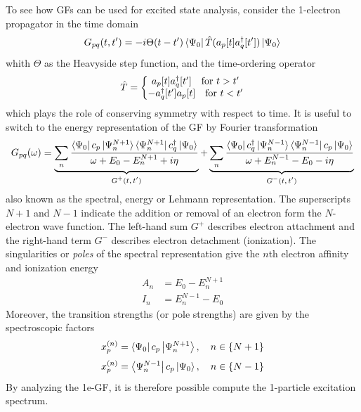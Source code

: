 To see how GFs can be used for excited state analysis, consider the 1-electron propagator in the time domain
\begin{equation}
G_{pq}(t,t') = - i\Theta(t-t') \bra{\smash{\Psi_0}} \hat{T}(a_p[t]a
_q^{\dagger}[t']) \ket{\smash{\Psi_0}}
\end{equation}
\noindent whith $\Theta$ as the Heavyside step function, and the time-ordering operator 
\begin{equation}
\hat{T} = \left\lbrace \begin{matrix}
a_p[t] a_q^{\dagger}[t'] \quad \textrm{for } t > t' \\
-a_q^{\dagger}[t'] a_p[t] \quad \textrm{for } t < t'
\end{matrix}
\right.
\end{equation}
\noindent which plays the role of conserving symmetry with respect to time. It is useful to switch to the energy representation of the GF by Fourier transformation
\begin{equation}
G_{pq} (\omega) = \underbrace{ \sum_n \frac{
	\bra{\smash{\Psi_0}} c_p \ket{\smash{\Psi_n^{N+1}}}			    \bra{\smash{\Psi_n^{N+1}}} c_q ^{\dagger} \ket{\smash{\Psi_0}} 
}{
	\omega + E_0 - E_n^{N+1} + i \eta
}
}_{\text{$G^{+}(t,t')$}} + 
\underbrace{
\sum_n \frac{
	\bra{\smash{\Psi_0}} c_q ^{\dagger} \ket{\smash{\Psi_n^{N-1}}}			    \bra{\smash{\Psi_n^{N-1}}} c_p \ket{\smash{\Psi_0}}
}{
	\omega + E_n^{N-1} - E_0 - i \eta
}
}_{\text{$G^{-}(t,t')$}}
\end{equation}
\noindent also known as the spectral, energy or Lehmann representation. The superscripts $N+1$ and $N-1$ indicate the addition or removal of an electron form the $N$-electron wave function. The left-hand sum $G^{+}$ describes electron attachment and the right-hand term $G^{-}$ describes electron detachment (ionization). The singularities or \emph{poles} of the spectral representation give the $n$th electron affinity and ionization energy 
\begin{align}
A_n &= E_0 - E_n^{N+1} \\
I_n &= E_n^{N-1} - E_0
\end{align}
\noindent Moreover, the transition strengths (or pole strengths) are given by the spectroscopic factors 
\begin{equation}
x_p^{(n)} = \bra{\Psi_0 } c_p \ket{\Psi_n ^{N+1} }, \quad n \in \left\lbrace N + 1 \right\rbrace
\end{equation}
\begin{equation}
x_p^{(n)} = \bra{\Psi_n^{N-1} } c_p \ket{\Psi_0 }, \quad n \in \left\lbrace N - 1 \right\rbrace
\end{equation}
\noindent By analyzing the 1e-GF, it is therefore possible compute the 1-particle excitation spectrum. 

